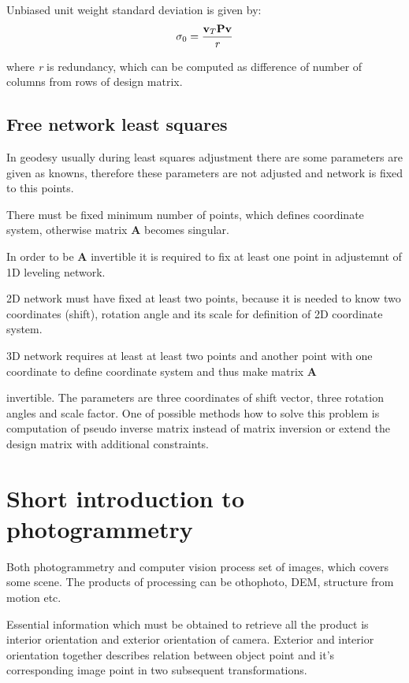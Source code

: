 \documentclass[a4paper,12pt]{report}
\newcommand{\ematr}[1]{
{\bf #1}
}
\newcommand{\evect}[1]{
{\bf #1}
}
\newcommand{\escal}[1]{
{\it #1}
}
\begin{document}
Unbiased unit weight standard deviation is given by:
\begin{equation}
\sigma_{0} = \frac{\evect{v}_{T} \ematr{P}  \evect{v}}{\escal{r}}
\end{equation} 

where \escal{r} is redundancy, which can be computed as difference of number of columns from rows of design matrix.

\subsection{Free network least squares}
\label{sec:free_net_least}

In geodesy usually during least squares adjustment there are some parameters are given as knowns, 
therefore these parameters are not adjusted and network is fixed to this points. 

There must be fixed minimum number of points, which defines coordinate system, otherwise 
matrix \ematr{A} becomes singular. 


In order to be \ematr{A} invertible it is required to fix at least one point in adjustemnt of 1D leveling network.

2D network must have fixed at least two points, because it is needed  
to know two coordinates (shift), rotation angle and its scale for definition of 2D coordinate system. 

3D network requires at least at least 
two points and another point with one coordinate to define coordinate system and thus make matrix \ematr{A}
invertible. The parameters are three coordinates of shift vector, three rotation angles and scale factor. 
One of possible methods how to solve this problem is computation of pseudo inverse matrix instead of matrix inversion or 
extend the design matrix with additional constraints.

\section{Short introduction to photogrammetry}

Both photogrammetry and computer vision process set of images, which covers some scene.
The products of processing can be othophoto, DEM, structure from motion etc. 

Essential information which must be obtained to retrieve  all the product is 
interior orientation and exterior orientation of camera.
Exterior and interior orientation together describes relation between object point and
it's corresponding image point in two subsequent transformations.  
\end{document}
